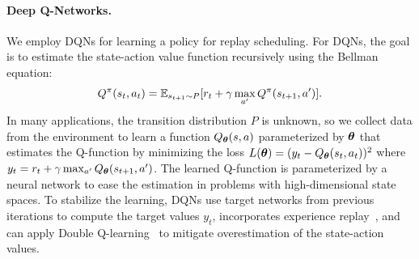 
\paragraph{Deep Q-Networks.} We employ DQNs for learning a policy for replay scheduling. For DQNs, the goal is to estimate the state-action value function recursively using the Bellman equation:
\begin{align}
    Q^{\pi}(s_{t}, a_{t}) = \mathbb{E}_{s_{t+1} \sim P} [r_t + \gamma \max_{a'} Q^{\pi}(s_{t+1}, a')].
\end{align}
In many applications, the transition distribution $P$ is unknown, so we collect data from the environment to learn a function $Q_{{\bm{\theta}}}(s, a)$ parameterized by ${\bm{\theta}}$ that estimates the Q-function by minimizing the loss $L({\bm{\theta}}) = (y_t - Q_{{\bm{\theta}}}(s_t, a_t))^2$ where $y_t = r_t + \gamma \max_{a'} Q_{{\bm{\theta}}}(s_{t+1}, a')$. The learned Q-function is parameterized by a neural network to ease the estimation in problems with high-dimensional state spaces. To stabilize the learning, DQNs use target networks from previous iterations to compute the target values $y_t$, incorporates experience replay~, and can apply Double Q-learning~ to mitigate overestimation of the state-action values.  



